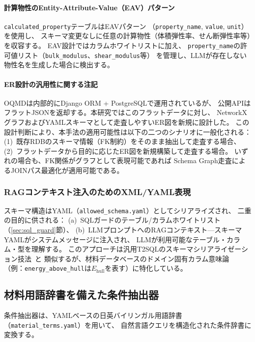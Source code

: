\documentclass[5p,twocolumn]{elsarticle}
\begin{document}
\paragraph{計算物性のEntity-Attribute-Value（EAV）パターン}
\texttt{calculated\_property}テーブルはEAVパターン
（\texttt{property\_name}, \texttt{value}, \texttt{unit}）を使用し、
スキーマ変更なしに任意の計算物性（体積弾性率、せん断弾性率等）を収容する。
EAV設計ではカラムホワイトリストに加え、
\texttt{property\_name}の許可値リスト（\texttt{bulk\_modulus}、\texttt{shear\_modulus}等）
を管理し、LLMが存在しない物性名を生成した場合に検出する。

\paragraph{ER設計の汎用性に関する注記}
OQMDは内部的にDjango ORM + PostgreSQLで運用されているが、
公開APIはフラットJSONを返却する。本研究ではこのフラットデータに対し、
NetworkXグラフおよびYAMLスキーマとして走査しやすいER図を新規に設計した。
この設計判断により、本手法の適用可能性は以下の二つのシナリオに一般化される：
(1)~既存RDBのスキーマ情報（FK制約）をそのまま抽出して走査する場合、
(2)~フラットデータから目的に応じたER図を新規構築して走査する場合。
いずれの場合も、FK関係がグラフとして表現可能であれば
Schema Graph走査によるJOINパス最適化が適用可能である。

\subsubsection{RAGコンテキスト注入のためのXML/YAML表現}

スキーマ構造はYAML（\texttt{allowed\_schema.yaml}）としてシリアライズされ、
二重の目的に供される：
(a)~SQLガードのテーブル/カラムホワイトリスト（\ref{sec:sql_guard}節）、
(b)~LLMプロンプトへのRAGコンテキスト---スキーマYAMLがシステムメッセージに注入され、
LLMが利用可能なテーブル・カラム・型を理解する。
このアプローチは汎用T2SQLのスキーマシリアライゼーション技法~\citep{gao2023dail}と
類似するが、材料データベースのドメイン固有カラム意味論
（例：\texttt{energy\_above\_hull}は$E_\text{hull}$を表す）に特化している。

\subsection{材料用語辞書を備えた条件抽出器}
\label{sec:entity_extractor}

条件抽出器は、YAMLベースの日英バイリンガル用語辞書（\texttt{material\_terms.yaml}）を用いて、
自然言語クエリを構造化された条件辞書に変換する。
\end{document}
